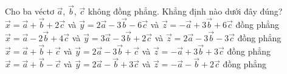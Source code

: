\begin{ex}%
	Cho ba véctơ $\overrightarrow{a}$, $\overrightarrow{b}$, $\overrightarrow{c}$ không đồng  phẳng. Khẳng định nào dưới đây đúng?
	 \choice
		{\True $\overrightarrow{x}=\overrightarrow{a}+\overrightarrow{b}+2\overrightarrow{c}$ và $\overrightarrow{y}=2\overrightarrow{a}-3\overrightarrow{b}-6\overrightarrow{c}$ và $\overrightarrow{z}=-\overrightarrow{a}+3\overrightarrow{b}+6\overrightarrow{c}$ đồng  phẳng}
		 {$\overrightarrow{x}=\overrightarrow{a}-2\overrightarrow{b}+4\overrightarrow{c}$ và $\overrightarrow{y}=3\overrightarrow{a}-3\overrightarrow{b}+2\overrightarrow{c}$ và $\overrightarrow{z}=2\overrightarrow{a}-3\overrightarrow{b}-3\overrightarrow{c}$ đồng phẳng}
		{$\overrightarrow{x}=\overrightarrow{a}+\overrightarrow{b}+\overrightarrow{c}$ và $\overrightarrow{y}=2\overrightarrow{a}-3\overrightarrow{b}+\overrightarrow{c}$  và $\overrightarrow{z}=-\overrightarrow{a}+3\overrightarrow{b}+3\overrightarrow{c}$ đồng phẳng}
		{$\overrightarrow{x}=\overrightarrow{a}+\overrightarrow{b}-\overrightarrow{c}$  và $\overrightarrow{y}=2\overrightarrow{a}-\overrightarrow{b}+3\overrightarrow{c}$ và $\overrightarrow{z}=-\overrightarrow{a}-\overrightarrow{b}+2\overrightarrow{c}$ đồng phẳng}
\end{ex}

